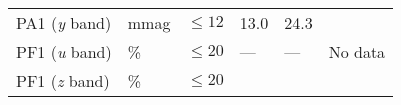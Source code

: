 \begin{longtable}[]{@{}llllll@{}}
\begin{minipage}[t]{0.14\columnwidth}\raggedright\strut
PA1 (\emph{y} band)\strut
\end{minipage} & \begin{minipage}[t]{0.06\columnwidth}\raggedright\strut
mmag\strut
\end{minipage} & \begin{minipage}[t]{0.17\columnwidth}\raggedright\strut
\(\leq 12\)\strut
\end{minipage} & \begin{minipage}[t]{0.17\columnwidth}\raggedright\strut
13.0\strut
\end{minipage} & \begin{minipage}[t]{0.12\columnwidth}\raggedright\strut
24.3\strut
\end{minipage} & \begin{minipage}[t]{0.17\columnwidth}\raggedright\strut
\strut
\end{minipage}\tabularnewline
\begin{minipage}[t]{0.14\columnwidth}\raggedright\strut
PF1 (\emph{u} band)\strut
\end{minipage} & \begin{minipage}[t]{0.06\columnwidth}\raggedright\strut
\%\strut
\end{minipage} & \begin{minipage}[t]{0.17\columnwidth}\raggedright\strut
\(\leq 20\)\strut
\end{minipage} & \begin{minipage}[t]{0.17\columnwidth}\raggedright\strut
---\strut
\end{minipage} & \begin{minipage}[t]{0.12\columnwidth}\raggedright\strut
---\strut
\end{minipage} & \begin{minipage}[t]{0.17\columnwidth}\raggedright\strut
No data\strut
\end{minipage}\tabularnewline
\begin{minipage}[t]{0.14\columnwidth}\raggedright\strut
PF1 (\emph{z} band)\strut
\end{minipage} & \begin{minipage}[t]{0.06\columnwidth}\raggedright\strut
\%\strut
\end{minipage} & \begin{minipage}[t]{0.17\columnwidth}\raggedright\strut
\(\leq 20\)\strut
\end{minipage} & \begin{minipage}[t]{0.17\columnwidth}\raggedright\strut

\end{minipage}
\end{longtable}
